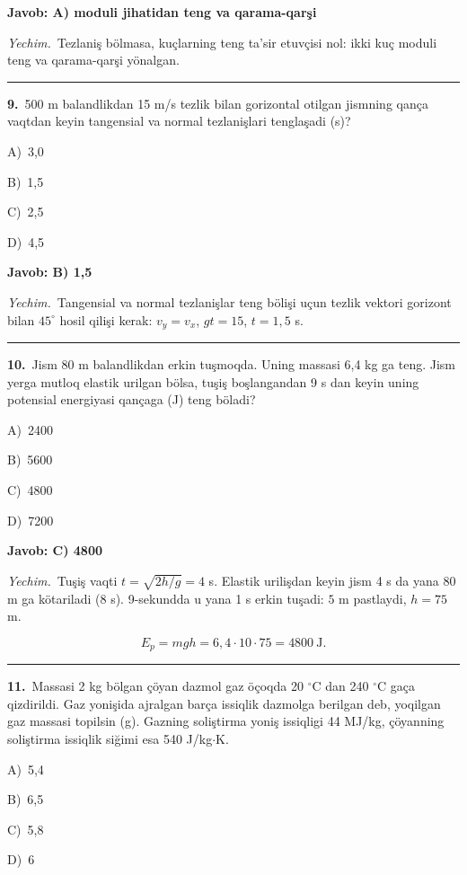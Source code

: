 \documentclass[11pt,a4paper]{article}
\newcommand{\opt}[2]{\hspace*{4mm}#1)\ #2\par}
\begin{document}
\noindent\colorbox{gray!12}{\parbox{\dimexpr\linewidth-2\fboxsep}{\textbf{Javob: A) moduli jihatidan teng va qarama-qarşi}}}\par\smallskip
\noindent\textit{Yechim.}\ Tezlaniş bölmasa, kuçlarning teng ta’sir etuvçisi nol: ikki kuç moduli teng va qarama-qarşi yönalgan.\par\par\medskip\hrule\medskip
{}\noindent\begin{minipage}{\linewidth}
\textbf{9.}\ 500 m balandlikdan 15 m/s tezlik bilan gorizontal otilgan jismning qança vaqtdan keyin tangensial va normal tezlanişlari tenglaşadi (s)?\par\smallskip
\opt{A}{3,0}
\opt{B}{1,5}
\opt{C}{2,5}
\opt{D}{4,5}
\end{minipage}\vspace{2pt}\par
\noindent\colorbox{gray!12}{\parbox{\dimexpr\linewidth-2\fboxsep}{\textbf{Javob: B) 1,5}}}\par\smallskip
\noindent\textit{Yechim.}\ Tangensial va normal tezlanişlar teng bölişi uçun tezlik vektori gorizont bilan $45^\circ$ hosil qilişi kerak: $v_y=v_x$, $gt=15$, $t=1{,}5$ s.\par\par\medskip\hrule\medskip
{}\noindent\begin{minipage}{\linewidth}
\textbf{10.}\ Jism 80 m balandlikdan erkin tuşmoqda. Uning massasi 6,4 kg ga teng. Jism yerga mutloq elastik urilgan bölsa, tuşiş boşlangandan 9 s dan keyin uning potensial energiyasi qançaga (J) teng böladi?\par\smallskip
\opt{A}{2400}
\opt{B}{5600}
\opt{C}{4800}
\opt{D}{7200}
\end{minipage}\vspace{2pt}\par
\noindent\colorbox{gray!12}{\parbox{\dimexpr\linewidth-2\fboxsep}{\textbf{Javob: C) 4800}}}\par\smallskip
\noindent\textit{Yechim.}\ Tuşiş vaqti $t=\sqrt{2h/g}=4$ s. Elastik urilişdan keyin jism 4 s da yana 80 m ga kötariladi (8 s). 9-sekundda u yana 1 s erkin tuşadi: $5$ m pastlaydi, $h=75$ m.\par
\[E_p=mgh=6{,}4\cdot10\cdot75=4800\ \text{J}.\]\par\medskip\hrule\medskip
{}\noindent\begin{minipage}{\linewidth}
\textbf{11.}\ Massasi 2 kg bölgan çöyan dazmol gaz öçoqda 20 $^\circ$C dan 240 $^\circ$C gaça qizdirildi. Gaz yonişida ajralgan barça issiqlik dazmolga berilgan deb, yoqilgan gaz massasi topilsin (g). Gazning soliştirma yoniş issiqligi 44 MJ/kg, çöyanning soliştirma issiqlik siğimi esa 540 J/kg$\cdot$K.\par\smallskip
\opt{A}{5,4}
\opt{B}{6,5}
\opt{C}{5,8}
\opt{D}{6}
\end{minipage}\vspace{2pt}\par
\end{document}
